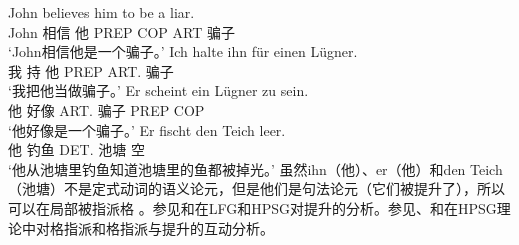 \eal
\ex 
\gll John believes him to be a liar.\\
	 John 相信 他 PREP COP ART 骗子\\
\glt `John相信他是一个骗子。'
\ex 
\gll Ich halte ihn für einen Lügner.\\
	我 持 他 PREP ART.\acc{} 骗子\\
\glt `我把他当做骗子。'
\ex 
\gll Er scheint ein Lügner zu sein.\\
	 他 好像 ART.\nom{} 骗子 PREP COP\\
\glt `他好像是一个骗子。'	 
\ex 
\gll Er fischt den Teich leer.\\
	 他 钓鱼 DET.\acc{} 池塘 空\\
\glt `他从池塘里钓鱼知道池塘里的鱼都被掉光。'
\zl
虽然ihn（他）、er（他）和den Teich（池塘）不是定式动词的语义论元，但是他们是句法论元（它们被提升了），所以可以在局部被指派格 。参见和在LFG\indexlfgc 和HPSG\indexhpsgc 对提升的分析。参见、和在HPSG理论中对格指派和格指派与提升的互动分析。

